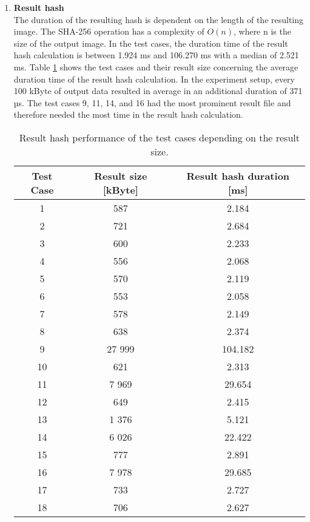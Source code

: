 \documentclass[draft,final]{vutinfth} %
\begin{document}
\begin{enumerate}
\begin{figure}[!h]
\begin{tikzpicture}
		\end{tikzpicture}
	\end{figure}
	\item \textbf{Result hash} \\
	The duration of the resulting hash is dependent on the length of the resulting image. The SHA-256 operation has a complexity of $O(n)$, where n is the size of the output image. In the test cases, the duration time of the result hash calculation is between 1.924 ms and 106.270 ms with a median of 2.521 ms. Table \ref{Tab:result_hash} shows the test cases and their result size concerning the average duration time of the result hash calculation. In the experiment setup, every 100 kByte of output data resulted in average in an additional duration of 371 µs. The test cases 9, 11, 14, and 16 had the most prominent result file and therefore needed the most time in the result hash calculation.     
	
	\begin{table}[]
		\centering
		\caption{Result hash performance of the test cases depending on the result size.}
		\begin{tabular}{c|c|c}
			\textbf{Test Case} & \textbf{Result size [kByte]} & \textbf{Result hash duration [ms]}  \\ \hline
			1 & 587  & 2.184 \\ \hline 
			2 & 721 & 2.684 \\ \hline
			3 & 600 & 2.233 \\ \hline
			4 & 556 & 2.068 \\ \hline
			5 & 570 & 2.119 \\ \hline
			6 & 553 & 2.058 \\ \hline
			7 & 578 & 2.149 \\ \hline
			8 & 638 & 2.374 \\ \hline
			9 & 27 999 & 104.182 \\ \hline
			10 & 621 & 2.313 \\ \hline
			11 & 7 969 & 29.654 \\ \hline
			12 & 649 & 2.415 \\ \hline
			13 & 1 376 & 5.121 \\ \hline
			14 & 6 026 & 22.422 \\ \hline
			15 & 777 & 2.891 \\ \hline
			16 & 7 978 & 29.685 \\ \hline
			17 & 733 & 2.727 \\ \hline
			18 & 706 & 2.627 \\ 
		\end{tabular}
		\label{Tab:result_hash}
	\end{table}
	

\end{enumerate}
\end{document}
